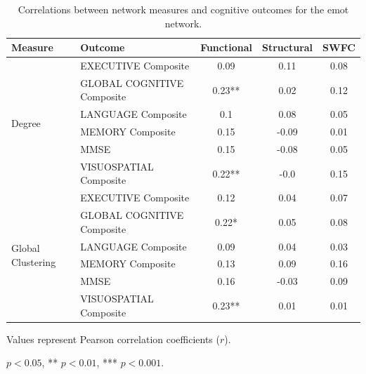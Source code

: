\begin{table}[htbp]
\centering
\begin{threeparttable}
\caption{Correlations between network measures and cognitive outcomes for the emot network.}
\small
\begin{tabular}{llccc}
\toprule
Measure & Outcome & Functional & Structural & SWFC \\
\midrule
\multirow{6}{*}{Degree} & EXECUTIVE Composite & 0.09 & 0.11 & 0.08 \\
& GLOBAL COGNITIVE Composite & 0.23** & 0.02 & 0.12 \\
& LANGUAGE Composite & 0.1 & 0.08 & 0.05 \\
& MEMORY Composite & 0.15 & -0.09 & 0.01 \\
& MMSE & 0.15 & -0.08 & 0.05 \\
& VISUOSPATIAL Composite & 0.22** & -0.0 & 0.15 \\
\midrule
\multirow{6}{*}{Global Clustering} & EXECUTIVE Composite & 0.12 & 0.04 & 0.07 \\
& GLOBAL COGNITIVE Composite & 0.22* & 0.05 & 0.08 \\
& LANGUAGE Composite & 0.09 & 0.04 & 0.03 \\
& MEMORY Composite & 0.13 & 0.09 & 0.16 \\
& MMSE & 0.16 & -0.03 & 0.09 \\
& VISUOSPATIAL Composite & 0.23** & 0.01 & 0.01 \\
\bottomrule
\end{tabular}
\begin{tablenotes}
\footnotesize
\item Values represent Pearson correlation coefficients ($r$).
\item * $p<0.05$, ** $p<0.01$, *** $p<0.001$.
\end{tablenotes}
\end{threeparttable}
\end{table}



